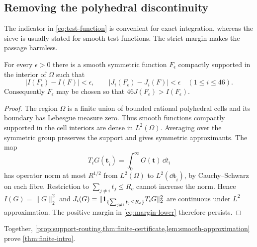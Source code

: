\subsection{Removing the polyhedral discontinuity}

The indicator in \cref{eq:test-function} is convenient for exact
integration, whereas the sieve is usually stated for smooth test functions.
The strict margin makes the passage harmless.

\begin{lemma}\label{lem:smooth-approximation}
For every $\epsilon>0$ there is a smooth symmetric function
$F_\epsilon$ compactly supported in the interior of $\Omega$ such that
\[
 |I(F_\epsilon)-I(F)|<\epsilon,\qquad
 |J_i(F_\epsilon)-J_i(F)|<\epsilon
 \quad(1\le i\le46).
\]
Consequently $F_\epsilon$ may be chosen so that
$46J(F_\epsilon)>I(F_\epsilon)$.
\end{lemma}

\begin{proof}
The region $\Omega$ is a finite union of bounded rational polyhedral cells
and its boundary has Lebesgue measure zero.  Thus smooth functions compactly
supported in the cell interiors are dense in $L^2(\Omega)$.  Averaging over
the symmetric group preserves the support and gives symmetric
approximants.  The map
\[
 T_iG(\mathbf t_{\widehat i})=\int_0^\infty G(\mathbf t)\,\dd t_i
\]
has operator norm at most $R^{1/2}$ from $L^2(\Omega)$ to
$L^2(\dd\mathbf t_{\widehat i})$, by Cauchy--Schwarz on each fibre.
Restriction to $\sum_{j\ne i}t_j\le R_o$ cannot increase the norm.
Hence $I(G)=\|G\|_2^2$ and
$J_i(G)=\|\mathbf 1_{\{\sum_{j\ne i}t_j\le R_o\}}T_iG\|_2^2$
are continuous under $L^2$ approximation.  The positive margin in
\cref{eq:margin-lower} therefore persists.
\end{proof}

Together, \cref{prop:support-routing,thm:finite-certificate,lem:smooth-approximation}
prove \cref{thm:finite-intro}.
